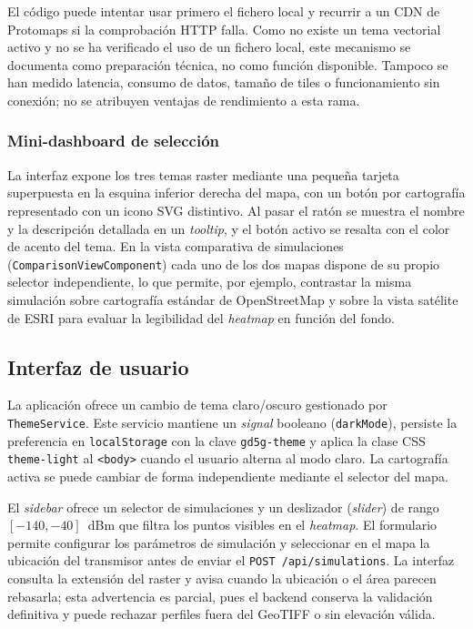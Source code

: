 El código puede intentar usar primero el fichero local y recurrir a un CDN de Protomaps si
la comprobación HTTP falla. Como no existe un tema vectorial activo y no se ha verificado
el uso de un fichero local, este mecanismo se documenta como preparación técnica, no como
función disponible. Tampoco se han medido latencia, consumo de datos, tamaño de tiles o
funcionamiento sin conexión; no se atribuyen ventajas de rendimiento a esta rama.

\subsubsection{Mini-dashboard de selección}

La interfaz expone los tres temas raster mediante una pequeña tarjeta superpuesta
en la esquina inferior derecha del mapa, con un botón por cartografía representado
con un icono SVG distintivo. Al pasar el ratón se muestra el nombre y la descripción
detallada en un \textit{tooltip}, y el botón activo se resalta con el color de
acento del tema. En la vista comparativa de simulaciones (\texttt{ComparisonViewComponent})
cada uno de los dos mapas dispone de su propio selector independiente, lo que permite,
por ejemplo, contrastar la misma simulación sobre cartografía estándar de
OpenStreetMap y sobre la vista satélite de ESRI para evaluar la legibilidad del
\textit{heatmap} en función del fondo.

\subsection{Interfaz de usuario}
\label{sec:frontend_ui}

La aplicación ofrece un cambio de tema claro/oscuro gestionado por
\texttt{ThemeService}. Este servicio mantiene un \textit{signal} booleano
(\texttt{darkMode}), persiste la preferencia en \texttt{localStorage} con la clave
\texttt{gd5g-theme} y aplica la clase CSS \texttt{theme-light} al \texttt{<body>}
cuando el usuario alterna al modo claro. La cartografía activa se puede cambiar de forma
independiente mediante el selector del mapa.

El \textit{sidebar} ofrece un selector de simulaciones y un deslizador
(\textit{slider}) de rango $[-140, -40]$~dBm que filtra los puntos visibles en el
\textit{heatmap}. El formulario permite configurar los parámetros de simulación y
seleccionar en el mapa la ubicación del transmisor antes de enviar el
\texttt{POST /api/simulations}. La interfaz consulta la extensión del raster y avisa
cuando la ubicación o el área parecen rebasarla; esta advertencia es parcial, pues el
backend conserva la validación definitiva y puede rechazar perfiles fuera del GeoTIFF o
sin elevación válida.

